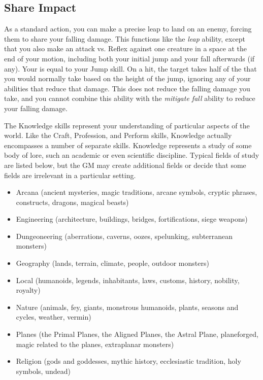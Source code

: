     \subsection{Share Impact}
        As a standard action, you can make a precise leap to land on an enemy, forcing them to share your falling damage.
        This functions like the \textit{leap} ability, except that you also make an attack vs. Reflex against one creature in a space at the end of your motion, including both your initial jump and your fall afterwards (if any).
        Your  is equal to your Jump skill.
        On a hit, the target takes half of the  that you would normally take based on the height of the jump, ignoring any of your abilities that reduce that damage.
        This does not reduce the falling damage you take, and you cannot combine this ability with the \textit{mitigate fall} ability to reduce your falling damage.

\newpage
{}
    The Knowledge skills represent your understanding of particular aspects of the world.
    Like the Craft, Profession, and Perform skills, Knowledge actually encompasses a number of separate skills.
    Knowledge represents a study of some body of lore, such an academic or even scientific discipline.
    Typical fields of study are listed below, but the GM may create additional fields or decide that some fields are irrelevant in a particular setting.
        \begin{itemize}
            \item Arcana (ancient mysteries, magic traditions, arcane symbols,
                cryptic phrases, constructs, dragons, magical beasts)
            \item Engineering (architecture, buildings, bridges, fortifications, siege weapons)
            \item Dungeoneering (aberrations, caverns, oozes, spelunking, subterranean monsters)
            \item Geography (lands, terrain, climate, people, outdoor monsters)
            \item Local (humanoids, legends, inhabitants, laws, customs, history, nobility, royalty)
            \item Nature (animals, fey, giants, monstrous humanoids, plants, seasons and cycles, weather, vermin)
            \item Planes (the Primal Planes, the Aligned Planes, the Astral Plane,
                planeforged, magic related to the planes, extraplanar monsters)
            \item Religion (gods and goddesses, mythic history, ecclesiastic tradition, holy symbols, undead)
        \end{itemize}

